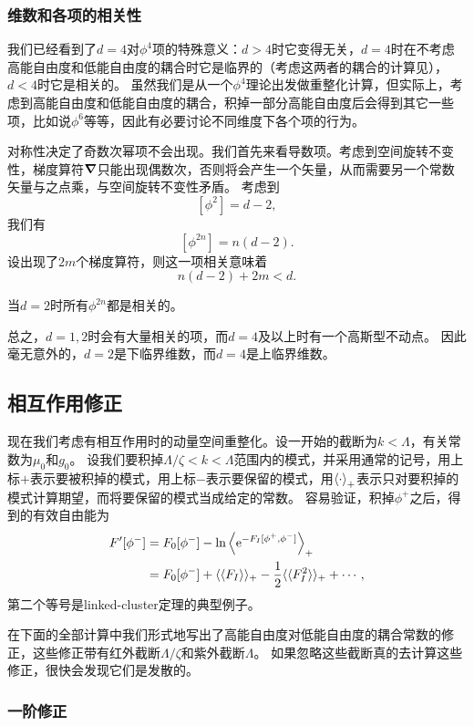 \documentclass[hyperref, UTF8, a4paper]{ctexart}
\newcommand*{\ee}{\mathrm{e}}
\newcommand*{\cexpval}[1]{\langle \langle #1 \rangle \rangle}
\renewcommand{\autoref}{\prettyref}
\begin{document}
\subsubsection{维数和各项的相关性}\label{sec:dimension-relevance}

我们已经看到了$d=4$对$\phi^4$项的特殊意义：$d>4$时它变得无关，$d=4$时在不考虑高能自由度和低能自由度的耦合时它是临界的（考虑这两者的耦合的计算见\autoref{sec:interaction-rg}），$d<4$时它是相关的。
虽然我们是从一个$\phi^4$理论出发做重整化计算，但实际上，考虑到高能自由度和低能自由度的耦合，积掉一部分高能自由度后会得到其它一些项，比如说$\phi^6$等等，因此有必要讨论不同维度下各个项的行为。

对称性决定了奇数次幂项不会出现。我们首先来看导数项。考虑到空间旋转不变性，梯度算符$\grad$只能出现偶数次，否则将会产生一个矢量，从而需要另一个常数矢量与之点乘，与空间旋转不变性矛盾。
考虑到
\[
    [\phi^2] = d - 2, 
\]
我们有
\[
    [\phi^{2n}] = n (d - 2).
\]
设出现了$2m$个梯度算符，则这一项相关意味着
\[
    n(d-2) + 2m < d.
\]

当$d=2$时所有$\phi^{2n}$都是相关的。

总之，$d=1, 2$时会有大量相关的项，而$d=4$及以上时有一个高斯型不动点。
因此毫无意外的，$d=2$是下临界维数，而$d=4$是上临界维数。

\subsection{相互作用修正}\label{sec:interaction-rg}

现在我们考虑有相互作用时的动量空间重整化。设一开始的截断为$k<\Lambda$，有关常数为$\mu_0$和$g_0$。
设我们要积掉$\Lambda/\zeta < k < \Lambda$范围内的模式，并采用通常的记号，用上标$+$表示要被积掉的模式，用上标$-$表示要保留的模式，用$\expval{\cdot}_+$表示只对要积掉的模式计算期望，而将要保留的模式当成给定的常数。
容易验证，积掉$\phi^+$之后，得到的有效自由能为
\[
    \begin{aligned}
        F'[\phi^-] &= F_0[\phi^-] - \ln \expval{\ee^{-F_I[\phi^+, \phi^-]}}_+ \\
        &= F_0[\phi^-] + \cexpval{F_I}_+ - \frac{1}{2} \cexpval{F_I^2}_+ + \cdots,
    \end{aligned}
\]
第二个等号是linked-cluster定理的典型例子。

在下面的全部计算中我们形式地写出了高能自由度对低能自由度的耦合常数的修正，这些修正带有红外截断$\Lambda / \zeta$和紫外截断$\Lambda$。
如果忽略这些截断真的去计算这些修正，很快会发现它们是发散的。

\subsubsection{一阶修正}
\end{document}

